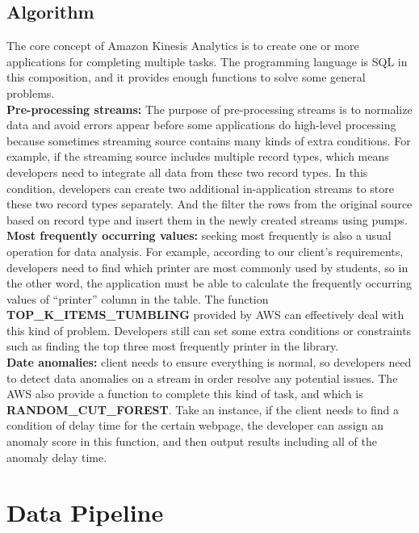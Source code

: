 	\subsection{Algorithm}
    The core concept of Amazon Kinesis Analytics is to create one or more applications for completing multiple tasks. The programming language is SQL in this composition, and it provides enough functions to solve some general problems.\\

	\noindent \textbf{Pre-processing streams:} The purpose of pre-processing streams is to normalize data and avoid errors appear before some applications do high-level processing because sometimes streaming source contains many kinds of extra conditions. For example, if the streaming source includes multiple record types, which means developers need to integrate all data from these two record types. In this condition, developers can create two additional in-application streams to store these two record types separately. And the filter the rows from the original source based on record type and insert them in the newly created streams using pumps.\cite{z4}\\

	\noindent \textbf{Most frequently occurring values:} seeking most frequently is also a usual operation for data analysis. For example, according to our client’s requirements, developers need to find which printer are most commonly used by students, so in the other word, the application must be able to calculate the frequently occurring values of “printer” column in the table. The function \textbf{TOP\_K\_ITEMS\_TUMBLING} provided by AWS can effectively deal with this kind of problem. Developers still can set some extra conditions or constraints such as finding the top three most frequently printer in the library.\\

	\noindent \textbf{Date anomalies:} client needs to ensure everything is normal, so developers need to detect data anomalies on a stream in order resolve any potential issues. The AWS also provide a function to complete this kind of task, and which is \textbf{RANDOM\_CUT\_FOREST}. Take an instance, if the client needs to find a condition of delay time for the certain webpage, the developer can assign an anomaly score in this function, and then output results including all of the anomaly delay time.
       
\section{Data Pipeline}

